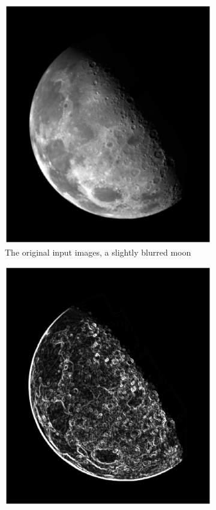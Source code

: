 \begin{figure}[!Hbt]
\centering
 \begin{subfigure}[b]{0.45\textwidth}
  \includegraphics[width=\textwidth]{moonOriginal.eps}
  \caption{The original input images, a slightly blurred moon}
  \label{fig:moonOrig}
 \end{subfigure}
 \begin{subfigure}[b]{0.45\textwidth}
  \includegraphics[width=\textwidth]{moonSharpened.eps}

\end{subfigure}
\end{figure}
